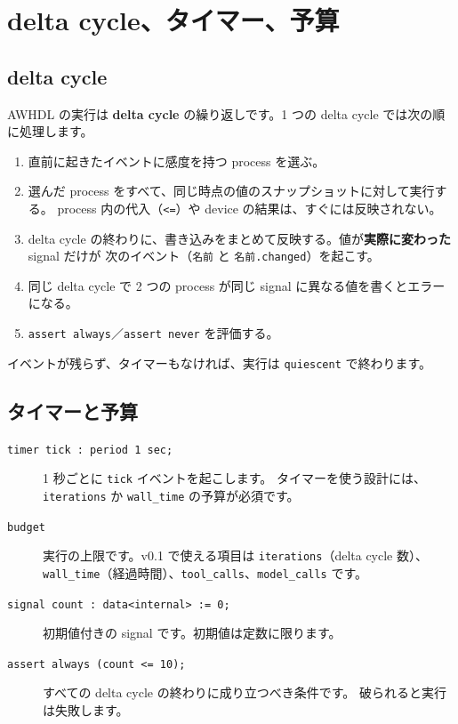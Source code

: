 \documentclass[a4paper,11pt]{ltjsarticle}
\newcommand{\ex}[1]{\texttt{examples/tutorial/#1}}
\begin{document}
\section{delta cycle、タイマー、予算}\label{sec:delta}

\subsection{delta cycle}

AWHDL の実行は \textbf{delta cycle} の繰り返しです。1 つの delta cycle では次の順に処理します。

\begin{enumerate}
  \item 直前に起きたイベントに感度を持つ process を選ぶ。
  \item 選んだ process をすべて、同じ時点の値のスナップショットに対して実行する。
        process 内の代入（\texttt{<=}）や device の結果は、すぐには反映されない。
  \item delta cycle の終わりに、書き込みをまとめて反映する。値が\textbf{実際に変わった} signal だけが
        次のイベント（\texttt{名前} と \texttt{名前.changed}）を起こす。
  \item 同じ delta cycle で 2 つの process が同じ signal に異なる値を書くとエラーになる。
  \item \texttt{assert always}／\texttt{assert never} を評価する。
\end{enumerate}

イベントが残らず、タイマーもなければ、実行は \texttt{quiescent} で終わります。

\subsection{タイマーと予算}



\begin{description}
  \item[\texttt{timer tick : period 1 sec;}] 1 秒ごとに \texttt{tick} イベントを起こします。
    タイマーを使う設計には、\texttt{iterations} か \texttt{wall\_time} の予算が必須です。
  \item[\texttt{budget}] 実行の上限です。v0.1 で使える項目は \texttt{iterations}（delta cycle 数）、
    \texttt{wall\_time}（経過時間）、\texttt{tool\_calls}、\texttt{model\_calls} です。
  \item[\texttt{signal count : data<internal> := 0;}] 初期値付きの signal です。初期値は定数に限ります。
  \item[\texttt{assert always (count <= 10);}] すべての delta cycle の終わりに成り立つべき条件です。
    破られると実行は失敗します。
\end{description}
\end{document}
